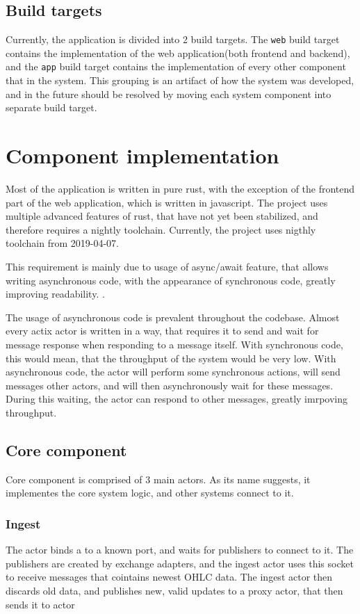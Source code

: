 \subsection{Build targets}
Currently, the application is divided into 2 build targets. The \verb|web| build target contains the implementation
of the web application(both frontend and backend), and the \verb|app| build target contains the implementation
of every other component that in the system. This grouping is an artifact of how the system was developed, and in the
future should be resolved by moving each system component into separate build target.

\section{Component implementation}
Most of the application is written in pure rust, with the exception of the frontend part of the web application, which
is written in javascript. The project uses multiple advanced features of rust, that have not yet been stabilized, and
therefore requires a nightly toolchain. Currently, the project uses nigthly toolchain from 2019-04-07.

This requirement is mainly due to usage of async/await feature, that allows writing asynchronous code, with the
appearance of synchronous code, greatly improving readability. .

The usage of asynchronous code is prevalent throughout the codebase. Almost every actix actor is written in a way, that requires
it to send and wait for message response when responding to a message itself. With synchronous code, this would mean, that
the throughput of the system would be very low. With asynchronous code, the actor will perform some synchronous actions,
will send messages other actors, and will then asynchronously wait for these messages. During this waiting, the actor
can respond to other messages, greatly imrpoving throughput.

\subsection{Core component}
Core component is comprised of 3 main actors. As its name suggests, it implementes the core system logic, and
other systems connect to it.

\subsubsection{Ingest}
The  actor binds a  to a known port, and waits for publishers to connect to it.
The publishers are created by exchange adapters, and the ingest actor uses this socket to receive
messages that cointains newest OHLC data. The ingest actor then discards old data, and publishes new, valid updates
to a proxy actor, that then sends it to  actor

